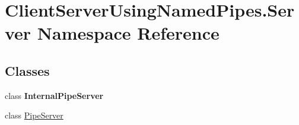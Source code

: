 \hypertarget{namespace_client_server_using_named_pipes_1_1_server}{}\section{Client\+Server\+Using\+Named\+Pipes.\+Server Namespace Reference}
\label{namespace_client_server_using_named_pipes_1_1_server}
\subsection*{Classes}
\begin{DoxyCompactItemize}
\item 
class {\bfseries Internal\+Pipe\+Server}
\item 
class \hyperlink{class_client_server_using_named_pipes_1_1_server_1_1_pipe_server}{Pipe\+Server}
\end{DoxyCompactItemize}
